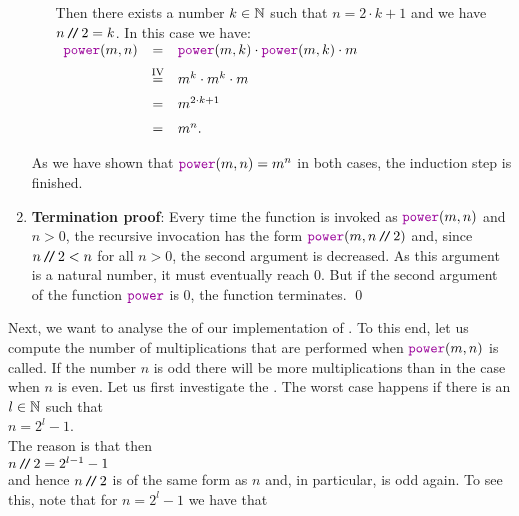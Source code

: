 \begin{enumerate}
\begin{enumerate}
            Then there exists a number $k \in {\mathbb N}$ such that $n = 2 \cdot k + 1$ and we have
            $n \mbox{\,\texttt{/}$\!$\texttt{/}\,} 2 = k$.  In this case we have:
            \\[0.2cm]
            \hspace*{1.3cm}
            $ 
            \begin{array}{lcl}
            \mytt{power}(m,n) & = & \mytt{power}(m,k) \cdot \mytt{power}(m,k) \cdot m  \\[0.2cm]
                                & \stackrel{\mathrm{IV}}{=} & m^k \cdot m^k \cdot m  \\[0.2cm]
                                & = & m^{2\cdot k+1} \\[0.2cm]
                                & = & m^{n}.
            \end{array}
            $
      \end{enumerate}
      As we have shown that $\mytt{power}(m,n) = m^n$ in both cases, the induction step is finished. \mycheck
\item \textbf{Termination proof}:
      Every time the function  is invoked as $\mytt{power}(m, n)$ and $n > 0$, the recursive
      invocation has the form $\mytt{power}(m,n \dv 2)$ and, since $n \mbox{\,\texttt{/}$\!$\texttt{/}\,} 2 < n$ for all $n > 0$, the second
      argument is decreased.  As this argument is a natural number, it must eventually reach $0$.  But if the
      second argument of the function $\mytt{power}$ is $0$, the function terminates. \mycheck
      \qed
\end{enumerate}
Next, we want to analyse the  of our implementation of .
To this end, let us compute the number of multiplications that are performed when
$\mytt{power}(m,n)$ is called.  If the number $n$ is odd there will be more multiplications than
in the case when $n$ is even.  Let us first investigate the .  
The worst case happens if there is an $l\in {\mathbb N}$ such that 
\\[0.2cm]
\hspace*{1.3cm}
$n = 2^l - 1$. 
\\[0.2cm]
The reason is that then
\\[0.2cm]
\hspace*{1.3cm} $n \mbox{\,\texttt{/}$\!$\texttt{/}\,} 2 = 2^{l-1} - 1$
\\[0.2cm]
and hence $n \mbox{\,\texttt{/}$\!$\texttt{/}\,} 2$ is of the same form as $n$ and, in particular, is odd again.  To see this, note that
for $n = 2^l - 1$ we have that
\\[0.2cm]
\hspace*{1.3cm}
